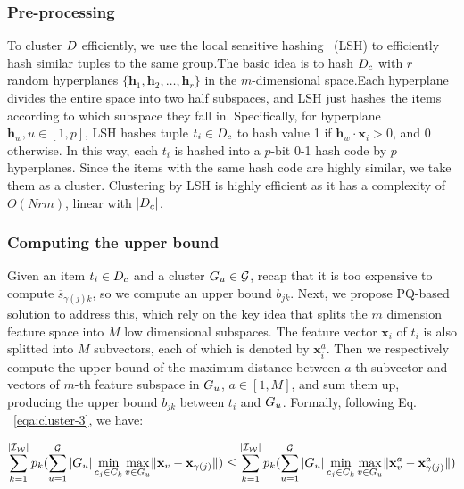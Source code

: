 \subsubsection{Pre-processing}
\label{subsec:clustering}
To cluster $D$ efficiently,  we use the local sensitive hashing~\cite{} (LSH) to efficiently hash similar tuples to the same group.The basic idea  is to hash $D_c$ with $r$ random hyperplanes $\{\mathbf{h}_1, \mathbf{h}_2, \dots, \mathbf{h}_r\}$ in the  $m$-dimensional space.Each hyperplane divides the entire space into two half subspaces, and LSH just hashes the  items according to which subspace they fall in. Specifically, for  hyperplane $\mathbf{h}_w, u\in[1,p]$, LSH hashes tuple $t_i\in D_c$ to hash value 1 if $\mathbf{h}_w \cdot \mathbf{x}_i> 0$, and 0 otherwise.
In this way, each $t_i$ is hashed into a $p$-bit 0-1 hash code by $p$ hyperplanes.
Since the items with the same hash code are highly similar, we take them as a cluster.
Clustering by LSH is highly efficient as it has a complexity of  $O(Nrm)$, linear with $|D_c|$. 

\subsubsection{Computing the upper bound}

Given an item $t_i\in D_c$ and a cluster $G_u \in \mathcal{G}$, recap that it is too expensive to  compute $\overline{s}_{\gamma(j)k}$, so we compute an upper bound $b_{jk}$. Next, we propose PQ-based solution to address this, which rely on the key idea that splits the $m$ dimension feature space into $M$ low dimensional subspaces. The feature vector $\mathbf{x}_i$ of  $t_i$ is also splitted into $M$ subvectors, each of which is denoted by $\mathbf{x}^a_i$. 
Then we respectively compute the upper bound of the maximum distance between $a$-th subvector and vectors of $m$-th feature subspace in $G_u$, $a\in [1,M]$, and sum them up, producing the upper bound $b_{jk}$ between $t_i$ and $G_u$. Formally, following Eq. ~\ref{eqa:cluster-3}, we have:

\begin{equation}\label{eqa:cluster-5}
    \begin{aligned}
    \sum_{k= 1}^{|\mathcal{I_W}|} p_k (\sum_{u=1}^{\mathcal{G}} |G_u| \min_{c_j\in C_k} \max_{v \in G_u} \lVert\mathbf{x}_v - \mathbf{x}_{\gamma(j)}\rVert) \leq    \sum_{k= 1}^{|\mathcal{I_W}|} p_k (\sum_{u=1}^{\mathcal{G}} |G_u| \min_{c_j\in C_k} \max_{v \in G_u} \lVert\mathbf{x}^a_v - \mathbf{x}^a_{\gamma(j)}\rVert)
    \end{aligned}
\end{equation}

